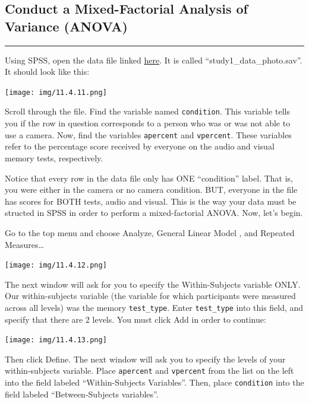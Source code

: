 \documentclass[]{book}
\begin{document}
\subsection{Conduct a Mixed-Factorial Analysis of Variance
(ANOVA)}\label{conduct-a-mixed-factorial-analysis-of-variance-anova}

\begin{center}\rule{0.5\linewidth}{0.5pt}\end{center}

Using SPSS, open the data file linked
\href{https://github.com/CrumpLab/statisticsLab/blob/master/data/spssdata/study1_data_photo.sav}{here}.
It is called ``study1\_data\_photo.sav''. It should look like this:

\texttt{[image: img/11.4.11.png]}

Scroll through the file. Find the variable named \texttt{condition}.
This variable tells you if the row in question corresponds to a person
who was or was not able to use a camera. Now, find the variables
\texttt{apercent} and \texttt{vpercent}. These variables refer to the
percentage score received by everyone on the audio and visual memory
tests, respectively.

Notice that every row in the data file only has ONE ``condition'' label.
That is, you were either in the camera or no camera condition. BUT,
everyone in the file has scores for BOTH tests, audio and visual. This
is the way your data must be structed in SPSS in order to perform a
mixed-factorial ANOVA. Now, let's begin.

Go to the top menu and choose {Analyze}, {General Linear Model }, and
{Repeated Measures\ldots{}}

\texttt{[image: img/11.4.12.png]}

The next window will ask for you to specify the Within-Subjects variable
ONLY. Our within-subjects variable (the variable for which participants
were measured across all levels) was the memory \texttt{test\_type}.
Enter \texttt{test\_type} into this field, and specify that there are 2
levels. You must click {Add} in order to continue:

\texttt{[image: img/11.4.13.png]}

Then click {Define}. The next window will ask you to specify the levels
of your within-subjects variable. Place \texttt{apercent} and
\texttt{vpercent} from the list on the left into the field labeled
``Within-Subjects Variables''. Then, place \texttt{condition} into the
field labeled ``Between-Subjects variables''.
\end{document}
